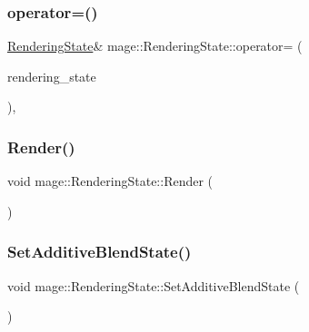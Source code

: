 \hypertarget{structmage_1_1_rendering_state_ad16e9963683b1eda6cbe675b8b210368}{}\label{structmage_1_1_rendering_state_ad16e9963683b1eda6cbe675b8b210368} 
\subsubsection{\texorpdfstring{operator=()}{operator=()}\hspace{0.1cm}{\footnotesize\ttfamily [2/2]}}
{\footnotesize\ttfamily \hyperlink{structmage_1_1_rendering_state}{Rendering\+State}\& mage\+::\+Rendering\+State\+::operator= (\begin{DoxyParamCaption}\item[{\hyperlink{structmage_1_1_rendering_state}{Rendering\+State} \&\&}]{rendering\+\_\+state }\end{DoxyParamCaption})\hspace{0.3cm}{\ttfamily [private]}, {\ttfamily [delete]}}

\hypertarget{structmage_1_1_rendering_state_a0a95ff66f5a136aceab2b7836c4d220c}{}\label{structmage_1_1_rendering_state_a0a95ff66f5a136aceab2b7836c4d220c} 
\subsubsection{\texorpdfstring{Render()}{Render()}}
{\footnotesize\ttfamily void mage\+::\+Rendering\+State\+::\+Render (\begin{DoxyParamCaption}{ }\end{DoxyParamCaption})}

\hypertarget{structmage_1_1_rendering_state_a61341d0fc7f1140faaf8fb33f9bb13fb}{}\label{structmage_1_1_rendering_state_a61341d0fc7f1140faaf8fb33f9bb13fb} 
\subsubsection{\texorpdfstring{Set\+Additive\+Blend\+State()}{SetAdditiveBlendState()}}
{\footnotesize\ttfamily void mage\+::\+Rendering\+State\+::\+Set\+Additive\+Blend\+State (\begin{DoxyParamCaption}{ }\end{DoxyParamCaption})}

